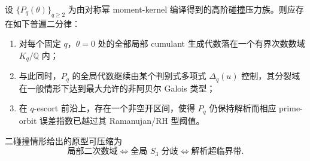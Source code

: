 \begin{conjecture}\label{conj:conclusion-realinput40-highq-localglobal-supercritical-bifurcation}
设 \(\{P_q(\theta)\}_{q\ge 2}\) 为由对称幂 moment-kernel 编译得到的高阶碰撞压力族。则应存在如下普遍二分律：
\begin{enumerate}
  \item 对每个固定 \(q\)，\(\theta=0\) 处的全部局部 cumulant 生成代数落在一个有界次数数域 \(K_q/\mathbb Q\) 内；
  \item 与此同时，\(P_q\) 的全局代数继续由某个判别式多项式 \(\Delta_q(u)\) 控制，其分裂域在一般情形下达到最大允许的非阿贝尔 Galois 类型；
  \item 在 \(q\)-escort 前沿上，存在一个非空开区间，使得 \(P_q\) 仍保持解析而相应 prime-orbit 误差指数已越过其 Ramanujan/RH 型阈值。
\end{enumerate}
二碰撞情形给出的原型可压缩为
\[
\text{局部二次数域}
\Longleftrightarrow
\text{全局 }S_3\text{ 分歧}
\Longleftrightarrow
\text{解析超临界带}.
\]
\end{conjecture}

